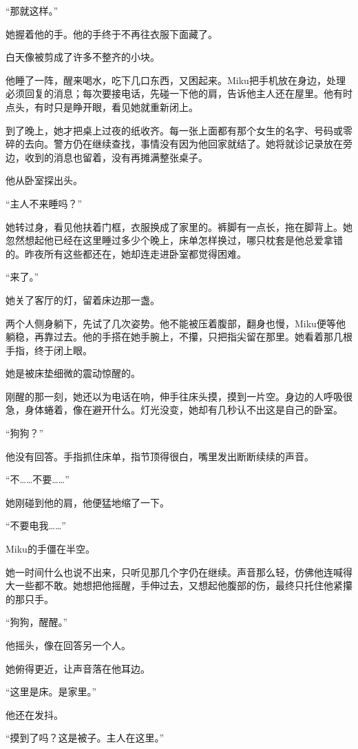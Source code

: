 “那就这样。”

她握着他的手。他的手终于不再往衣服下面藏了。

\SceneBreak

白天像被剪成了许多不整齐的小块。

他睡了一阵，醒来喝水，吃下几口东西，又困起来。Miku把手机放在身边，处理必须回复的消息；每次要接电话，先碰一下他的肩，告诉他主人还在屋里。他有时点头，有时只是睁开眼，看见她就重新闭上。

到了晚上，她才把桌上过夜的纸收齐。每一张上面都有那个女生的名字、号码或零碎的去向。警方仍在继续查找，事情没有因为他回家就结了。她将就诊记录放在旁边，收到的消息也留着，没有再摊满整张桌子。

他从卧室探出头。

“主人不来睡吗？”

她转过身，看见他扶着门框，衣服换成了家里的。裤脚有一点长，拖在脚背上。她忽然想起他已经在这里睡过多少个晚上，床单怎样换过，哪只枕套是他总爱拿错的。昨夜所有这些都还在，她却连走进卧室都觉得困难。

“来了。”

她关了客厅的灯，留着床边那一盏。

两个人侧身躺下，先试了几次姿势。他不能被压着腹部，翻身也慢，Miku便等他躺稳，再靠过去。他的手搭在她手腕上，不攥，只把指尖留在那里。她看着那几根手指，终于闭上眼。

她是被床垫细微的震动惊醒的。

刚醒的那一刻，她还以为电话在响，伸手往床头摸，摸到一片空。身边的人呼吸很急，身体蜷着，像在避开什么。灯光没变，她却有几秒认不出这是自己的卧室。

“狗狗？”

他没有回答。手指抓住床单，指节顶得很白，嘴里发出断断续续的声音。

“不……不要……”

她刚碰到他的肩，他便猛地缩了一下。

“不要电我……”

Miku的手僵在半空。

她一时间什么也说不出来，只听见那几个字仍在继续。声音那么轻，仿佛他连喊得大一些都不敢。她想把他摇醒，手伸过去，又想起他腹部的伤，最终只托住他紧攥的那只手。

“狗狗，醒醒。”

他摇头，像在回答另一个人。

她俯得更近，让声音落在他耳边。

“这里是床。是家里。”

他还在发抖。

“摸到了吗？这是被子。主人在这里。”

